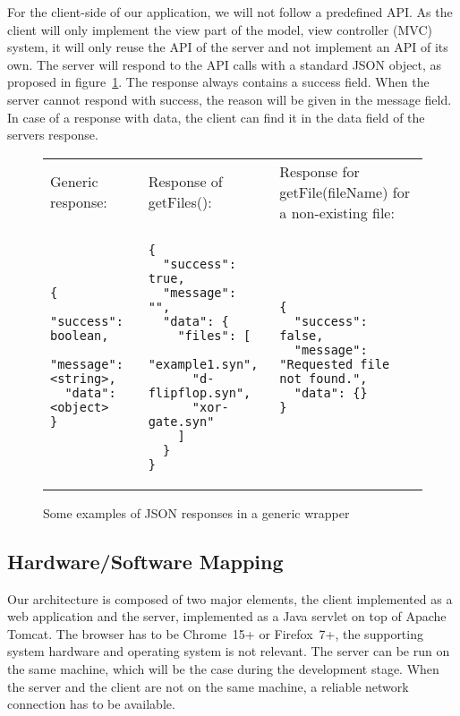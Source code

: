 \documentclass[a4paper]{article}
\begin{document}
For the client-side of our application, we will not follow a predefined API. As the client will only implement the view part of the model, view controller (MVC) system, it will only reuse the API of the server and not implement an API of its own. The server will respond to the API calls with a standard JSON object, as proposed in figure~\ref{fig-jsonDefault}. The response always contains a success field. When the server cannot respond with success, the reason will be given in the message field. In case of a response with data, the client can find it in the data field of the servers response. \\

\begin{figure}[h!]
\caption{Some examples of JSON responses in a generic wrapper}
\label{fig-jsonDefault}
{\footnotesize
\begin{tabular}{p{4.3cm} p{4.3cm} p{4.3cm}}
\\
	Generic response: &
	Response of getFiles(): &
	Response for getFile(fileName) for a non-existing file: \\
\begin{verbatim}
{
  "success": boolean,
  "message": <string>,
  "data": <object>
}
\end{verbatim}

&

\begin{verbatim}
{
  "success": true,
  "message": "",
  "data": {
    "files": [
      "example1.syn",
      "d-flipflop.syn",
      "xor-gate.syn"
    ]
  }
}
\end{verbatim}

&

\begin{verbatim}
{
  "success": false,
  "message": "Requested file not found.",
  "data": {}
}
\end{verbatim}
\\
\end{tabular} }

\end{figure}

\pagebreak
\pagebreak

\subsection{Hardware/Software Mapping}
Our architecture is composed of two major elements, the client implemented as a web application and the server, implemented as a Java servlet on top of Apache Tomcat. The browser has to be Chrome~15+ or Firefox~7+, the supporting system hardware and operating system is not relevant. The server can be run on the same machine, which will be the case during the development stage. When the server and the client are not on the same machine, a reliable network connection has to be available.
\end{document}
